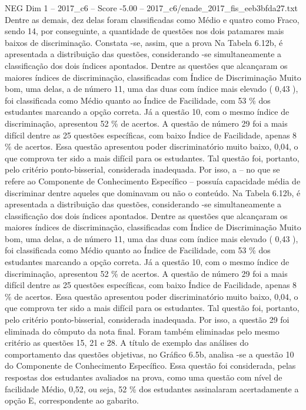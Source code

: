 \begin{textsample}{NEG Dim 1 – 2017\_c6 – Score -5.00 – 2017\_c6/enade\_2017\_fis\_eeb3bfda27.txt}
Dentre as demais, dez delas foram classificadas como Médio e quatro como Fraco, sendo 14, por conseguinte, a quantidade de questões nos dois patamares mais baixos de discriminação.
Constata -se, assim, que a prova Na Tabela 6.12b, é apresentada a distribuição das questões, considerando -se simultaneamente a classificação dos dois índices apontados.
Dentre as questões que alcançaram os maiores índices de discriminação, classificadas com Índice de Discriminação Muito bom, uma delas, a de número 11, uma das duas com índice mais elevado ( 0,43 ), foi classificada como Médio quanto ao Índice de Facilidade, com 53 \% dos estudantes marcando a opção correta.
Já a questão 10, com o mesmo índice de discriminação, apresentou 52 \% de acertos.
A questão de número 29 foi a mais difícil dentre as 25 questões específicas, com baixo Índice de Facilidade, apenas 8 \% de acertos.
Essa questão apresentou poder discriminatório muito baixo, 0,04, o que comprova ter sido a mais difícil para os estudantes.
Tal questão foi, portanto, pelo critério ponto-bisserial, considerada inadequada.
Por isso, a – no que se refere ao Componente de Conhecimento Específico – possuía capacidade média de discriminar dentre aqueles que dominavam ou não o conteúdo.
Na Tabela 6.12b, é apresentada a distribuição das questões, considerando -se simultaneamente a classificação dos dois índices apontados.
Dentre as questões que alcançaram os maiores índices de discriminação, classificadas com Índice de Discriminação Muito bom, uma delas, a de número 11, uma das duas com índice mais elevado ( 0,43 ), foi classificada como Médio quanto ao Índice de Facilidade, com 53 \% dos estudantes marcando a opção correta.
Já a questão 10, com o mesmo índice de discriminação, apresentou 52 \% de acertos.
A questão de número 29 foi a mais difícil dentre as 25 questões específicas, com baixo Índice de Facilidade, apenas 8 \% de acertos.
Essa questão apresentou poder discriminatório muito baixo, 0,04, o que comprova ter sido a mais difícil para os estudantes.
Tal questão foi, portanto, pelo critério ponto-bisserial, considerada inadequada.
Por isso, a questão 29 foi eliminada do cômputo da nota final.
Foram também eliminadas pelo mesmo critério as questões 15, 21 e 28.
A título de exemplo das análises do comportamento das questões objetivas, no Gráfico 6.5b, analisa -se a questão 10 do Componente de Conhecimento Específico.
Essa questão foi considerada, pelas respostas dos estudantes avaliados na prova, como uma questão com nível de facilidade Médio, 0,52, ou seja, 52 \% dos estudantes assinalaram acertadamente a opção E, correspondente ao gabarito.

\end{textsample}
